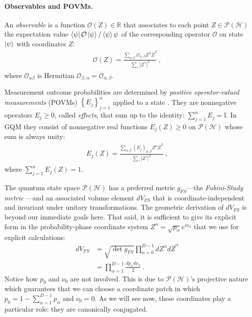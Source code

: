 \documentclass[draft,nofootinbib,pre,twocolumn,showpacs,showkeys,preprintnumbers,floatfix]{revtex4-1}
\newcommand{\1}{\mathbbm{1}}
\begin{document}
\paragraph*{Observables and POVMs.} An \emph{observable} is a function $\mathcal{O}(Z) \in
\mathbb{R}$ that associates to each point  $Z \in \mathcal{P}(\mathcal{H})$ the
expectation value $\bra{\psi} \mathcal{O} \ket{\psi}/\braket{\psi}{\psi}$ of the corresponding
operator $\mathcal{O}$ on state $\ket{\psi}$ with coordinates $Z$:
\begin{align}
\mathcal{O}(Z) = \frac{\sum_{\alpha,\beta} \mathcal{O}_{\alpha,\beta}Z^\alpha \overline{Z}^\beta}{\sum_{\gamma} \left\vert Z^\gamma\right\vert^2}
  ~,
\label{eq:GQM_Observable}
\end{align}
where $\mathcal{O}_{\alpha \beta}$ is Hermitian $\mathcal{O}_{\beta,\alpha} = \overline{\mathcal{O}}_{\alpha,\beta}$.

Measurement outcome probabilities are determined by \emph{positive
operator-valued measurements} (POVMs) $\left\{E_j\right\}_{j=1}^n$ applied to a
state \cite{Nielsen2010,Heinosaari2012}. They are nonnegative operators
$E_j\geq 0$, called \emph{effects}, that sum up to the identity: $\sum_{j=1}^n
E_j = \mathbb{I}$. In GQM they consist of nonnegative real functions $E_j(Z)\ge
0$ on $\mathcal{P}(\mathcal{H})$ whose sum is always unity:
\begin{align}
E_j(Z) = \frac{\sum_{\alpha,\beta}
  \left(E_j\right)_{\alpha,\beta} Z^\alpha \overline{Z}^\beta}{\sum_{\gamma} \left\vert Z^\gamma \right\vert^2}
  ~,
\label{eq:GQM_POVMs}
\end{align}
where $\sum_{j=1}^{n}E_j(Z) = 1$.

The quantum state space $\mathcal{P}(\mathcal{H})$ has a preferred metric 
$g_{FS}$---the \emph{Fubini-Study metric} \cite{Bengtsson2017}---and an 
associated volume element $dV_{FS}$ that is coordinate-independent and
invariant under unitary transformations. The geometric derivation of $dV_{FS}$
is beyond our immediate goals here. That said, it is sufficient to give its
explicit form in the probability-phase coordinate system $Z^{\alpha} =
\sqrt{p_\alpha}e^{i\nu_\alpha}$ that we use for explicit calculations: 
\begin{align*}
dV_{FS}
  & = \sqrt{\det g_{FS}}
  \prod_{\alpha=0}^{D-1} dZ^\alpha d\overline{Z}^\alpha \\
  & =  \prod_{\alpha=1}^{D-1} \frac{dp_\alpha d\nu_\alpha}{2}
  ~.
\end{align*}
Notice how $p_0$ and $\nu_0$ are not involved. This is due to
$\mathcal{P}(\mathcal{H})$'s projective nature which guarantees that we can
choose a coordinate patch in which $p_0 = 1 - \sum_{\alpha=1}^{D-1}p_\alpha$
and $\nu_0 = 0$. As we will see now, these coordinates play a particular role:
they are canonically conjugated.
\end{document}
